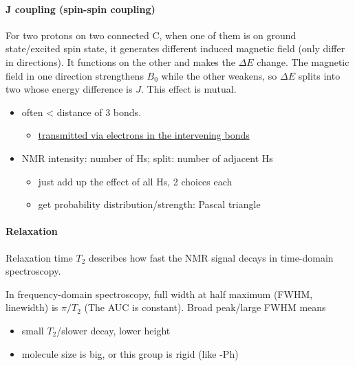 \documentclass[]{article}
\let\oldparagraph\paragraph
\renewcommand{\paragraph}[1]{\oldparagraph{#1}\mbox{}}
\begin{document}
\hypertarget{j-coupling-spin-spin-coupling}{%
\paragraph{J coupling (spin-spin
coupling)}\label{j-coupling-spin-spin-coupling}}

For two protons on two connected C, when one of them is on ground
state/excited spin state, it generates different induced magnetic field
(only differ in directions). It functions on the other and makes the
\(\Delta E\) change. The magnetic field in one direction strengthens
\(B_0\) while the other weakens, so \(\Delta E\) splits into two whose
energy difference is \(J\). This effect is mutual.

\begin{itemize}
\item
  often \textless{} distance of 3 bonds.

  \begin{itemize}
  \item
    \underline{transmitted via electrons in the intervening bonds}
  \end{itemize}
\item
  NMR intensity: number of Hs; split: number of adjacent Hs

  \begin{itemize}
  \item
    just add up the effect of all Hs, 2 choices each
  \item
    get probability distribution/strength: Pascal triangle
  \end{itemize}
\end{itemize}

\hypertarget{relaxation}{%
\paragraph{Relaxation}\label{relaxation}}

Relaxation time \(T_2\) describes how fast the NMR signal decays in
time-domain spectroscopy.

In frequency-domain spectroscopy, full width at half maximum (FWHM,
linewidth) is \(\pi/T_2\) (The AUC is constant). Broad peak/large FWHM
means

\begin{itemize}
\item
  small \(T_2\)/slower decay, lower height
\item
  molecule size is big, or this group is rigid (like -Ph)
\end{itemize}
\end{document}

